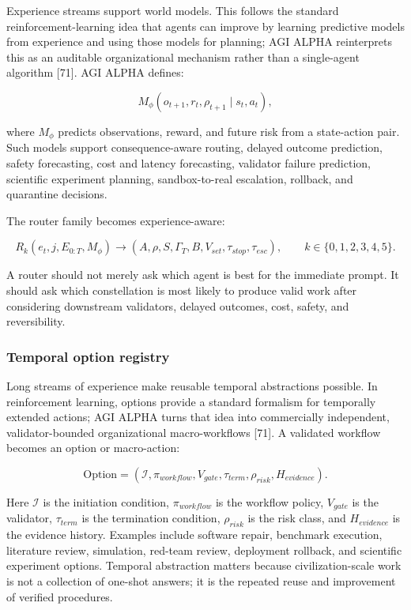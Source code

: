 \documentclass[11pt]{article}
\begin{document}
Experience streams support world models. This follows the standard reinforcement-learning idea that agents can improve by learning predictive models from experience and using those models for planning; AGI ALPHA reinterprets this as an auditable organizational mechanism rather than a single-agent algorithm {[}71{]}. AGI ALPHA defines:

\[
M_\phi(o_{t+1},r_t,\rho_{t+1}\mid s_t,a_t),
\]

where \(M_\phi\) predicts observations, reward, and future risk from a state-action pair. Such models support consequence-aware routing, delayed outcome prediction, safety forecasting, cost and latency forecasting, validator failure prediction, scientific experiment planning, sandbox-to-real escalation, rollback, and quarantine decisions.

The router family becomes experience-aware:

\[
R_k(e_t,j,E_{0:T},M_\phi)\rightarrow(A,\rho,S,\Gamma_T,B,V_{set},\tau_{stop},\tau_{esc}),\qquad k\in\{0,1,2,3,4,5\}.
\]

A router should not merely ask which agent is best for the immediate prompt. It should ask which constellation is most likely to produce valid work after considering downstream validators, delayed outcomes, cost, safety, and reversibility.

\subsubsection{Temporal option registry}\label{temporal-option-registry}

Long streams of experience make reusable temporal abstractions possible. In reinforcement learning, options provide a standard formalism for temporally extended actions; AGI ALPHA turns that idea into commercially independent, validator-bounded organizational macro-workflows {[}71{]}. A validated workflow becomes an option or macro-action:

\[
\mathrm{Option}=(\mathcal{I},\pi_{workflow},V_{gate},\tau_{term},\rho_{risk},H_{evidence}).
\]

Here \(\mathcal{I}\) is the initiation condition, \(\pi_{workflow}\) is the workflow policy, \(V_{gate}\) is the validator, \(\tau_{term}\) is the termination condition, \(\rho_{risk}\) is the risk class, and \(H_{evidence}\) is the evidence history. Examples include software repair, benchmark execution, literature review, simulation, red-team review, deployment rollback, and scientific experiment options. Temporal abstraction matters because civilization-scale work is not a collection of one-shot answers; it is the repeated reuse and improvement of verified procedures.
\end{document}
